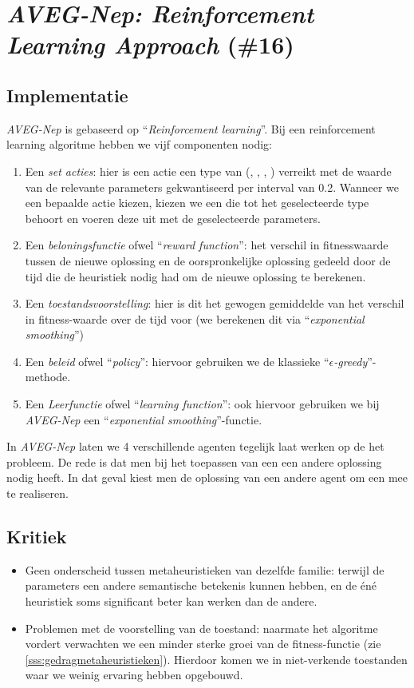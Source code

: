 \section{\emph{AVEG-Nep: Reinforcement Learning Approach} (\#16)}
\label{sss:aveg-nep}
\subsection{Implementatie}
\emph{AVEG-Nep}\cite{chesc-aveg-nep} is gebaseerd op ``\emph{Reinforcement learning}''\cite{rlaiacaml}. Bij een reinforcement learning algoritme hebben we vijf componenten nodig:
\begin{enumerate}
 \item Een \emph{set acties}: hier is een actie een type van \abllhn{} (\abmt{}, \abls{}, \abco{}, \abrr{}) verreikt met de waarde van de relevante parameters gekwantiseerd per interval van 0.2. Wanneer we een bepaalde actie kiezen, kiezen we een \abllh{} die tot het geselecteerde type behoort en voeren deze uit met de geselecteerde parameters.
 \item Een \emph{beloningsfunctie} ofwel ``\emph{reward function}'': het verschil in fitnesswaarde tussen de nieuwe oplossing en de oorspronkelijke oplossing gedeeld door de tijd die de heuristiek nodig had om de nieuwe oplossing te berekenen.
 \item Een \emph{toestandsvoorstelling}: hier is dit het gewogen gemiddelde van het verschil in fitness-waarde over de tijd voor (we berekenen dit via ``\emph{exponential smoothing}''\cite{Taylor2003a})
 \item Een \emph{beleid} ofwel ``\emph{policy}'': hiervoor gebruiken we de klassieke ``\emph{$\epsilon$-greedy}''-methode.
 \item Een \emph{Leerfunctie} ofwel ``\emph{learning function}'': ook hiervoor gebruiken we bij \emph{AVEG-Nep} een ``\emph{exponential smoothing}''-functie.
\end{enumerate}
In \emph{AVEG-Nep} laten we 4 verschillende agenten tegelijk laat werken op de het probleem. De rede is dat men bij het toepassen van een \abco{} \abh{} een andere oplossing nodig heeft. In dat geval kiest men de oplossing van een andere agent om een \abco{} mee te realiseren.
\subsection{Kritiek}
\begin{itemize}
 \item Geen onderscheid tussen metaheuristieken van dezelfde familie: terwijl de parameters een andere semantische betekenis kunnen hebben, en de \'en\'e heuristiek soms significant beter kan werken dan de andere.
 \item Problemen met de voorstelling van de toestand: naarmate het algoritme vordert verwachten we een minder sterke groei van de fitness-functie (zie \ref{sss:gedragmetaheuristieken}). Hierdoor komen we in niet-verkende toestanden waar we weinig ervaring hebben opgebouwd.
\end{itemize}